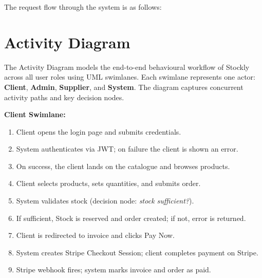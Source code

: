 \documentclass[12pt,a4paper]{report}
\begin{document}
The request flow through the system is as follows:
\begin{center}
\end{center}

\section{Activity Diagram}

The Activity Diagram models the end-to-end behavioural workflow of Stockly across all user roles using UML swimlanes. Each swimlane represents one actor: \textbf{Client}, \textbf{Admin}, \textbf{Supplier}, and \textbf{System}. The diagram captures concurrent activity paths and key decision nodes.

\textbf{Client Swimlane:}
\begin{enumerate}
    \item Client opens the login page and submits credentials.
    \item System authenticates via JWT; on failure the client is shown an error.
    \item On success, the client lands on the catalogue and browses products.
    \item Client selects products, sets quantities, and submits order.
    \item System validates stock (decision node: \emph{stock sufficient?}).
    \item If sufficient, Stock is reserved and order created; if not, error is returned.
    \item Client is redirected to invoice and clicks Pay Now.
    \item System creates Stripe Checkout Session; client completes payment on Stripe.
    \item Stripe webhook fires; system marks invoice and order as paid.
\end{enumerate}
\end{document}
